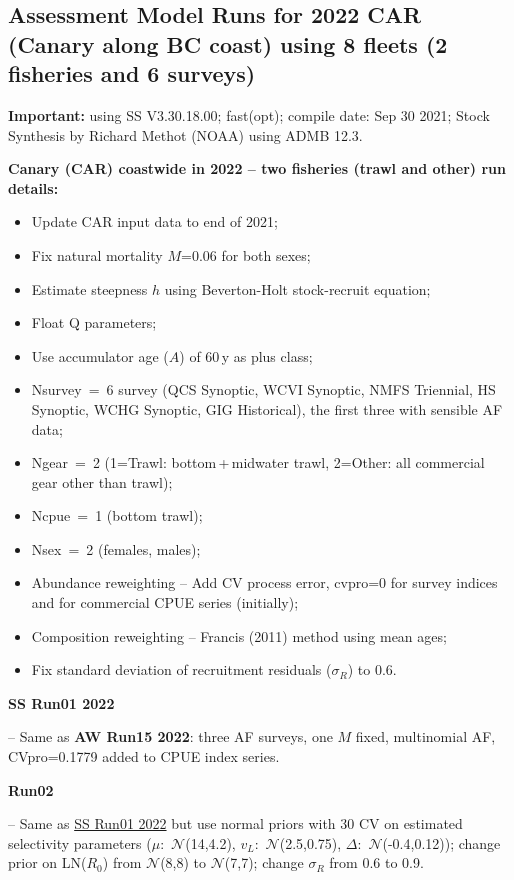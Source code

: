 
\subsection{Assessment Model Runs for 2022 CAR (Canary along BC coast) using 8 fleets (2 fisheries and 6 surveys)}

\textbf{Important:} using SS V3.30.18.00; fast(opt); compile date: Sep 30 2021; Stock Synthesis by Richard Methot (NOAA) using ADMB 12.3.

\textbf{Canary (CAR) coastwide in 2022 -- two fisheries (trawl and other) run details:}
\begin{itemize}
  \item Update CAR input data to end of 2021;
  \item Fix natural mortality $M$=0.06 for both sexes;%
  \item Estimate steepness $h$ using Beverton-Holt stock-recruit equation;
  \item Float Q parameters;
  \item Use accumulator age ($A$) of 60\,y as plus class;
  \item Nsurvey~=~6 survey (QCS Synoptic, WCVI Synoptic, NMFS Triennial, HS Synoptic, WCHG Synoptic, GIG Historical), the first three with sensible AF data;
  \item Ngear~=~2 (1=Trawl: bottom\,+\,midwater trawl, 2=Other: all commercial gear other than trawl);
  \item Ncpue~=~1 (bottom trawl);
  \item Nsex~=~2 (females, males);
  \item Abundance reweighting -- Add CV process error, cvpro=0 for survey indices and for commercial CPUE series (initially);
  \item Composition reweighting -- Francis (2011) method using mean ages;
  \item Fix standard deviation of recruitment residuals ($\sigma_R$) to 0.6.
\end{itemize}

\hypertarget{R01}{\textbf{SS Run01 2022}} -- Same as \textbf{AW Run15 2022}: three AF surveys, one $M$ fixed, multinomial AF, CVpro=0.1779 added to CPUE index series.

\hypertarget{R02}{\textbf{Run02}} -- Same as \hyperlink{R01}{SS Run01 2022} but use normal priors with 30\pc{} CV on estimated selectivity parameters ($\mu$:~$\mathcal{N}$(14,4.2), $v_{L}$:~$\mathcal{N}$(2.5,0.75), $\Delta$:~$\mathcal{N}$(-0.4,0.12)); change prior on LN($R_0$) from $\mathcal{N}$(8,8) to $\mathcal{N}$(7,7); change $\sigma_R$ from 0.6 to 0.9.

